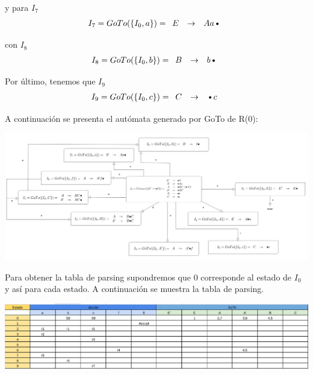 y para $I_7$
\[
I_7 = GoTo(\{I_0,a\}) = 
\begin{array}{rcl}
   E  & \to & Aa\text{\textbullet} \\
\end{array}
\]


con $I_8$
\[
I_8 = GoTo(\{I_0,b\}) = 
\begin{array}{rcl}
  B  & \to & b\text{\textbullet} \\
\end{array}
\]

Por último, tenemos que $I_9$
\[
I_9 = GoTo(\{I_0,c\}) = 
\begin{array}{rcl}
  C  & \to & \text{\textbullet}c \\
\end{array}
\]

A continuación se presenta el autómata generado por GoTo de R(0):
\begin{center}
        \includegraphics[scale=0.20]{./Im.png}\\[0.4cm]
\end{center}
 Para obtener la tabla de parsing supondremos que $0$ corresponde al estado de $I_0$
 y así para cada estado. A continuación se muestra la tabla de parsing.
\begin{center}
        \includegraphics[scale=0.20]{./T1.png}\\[0.4cm]
\end{center}
